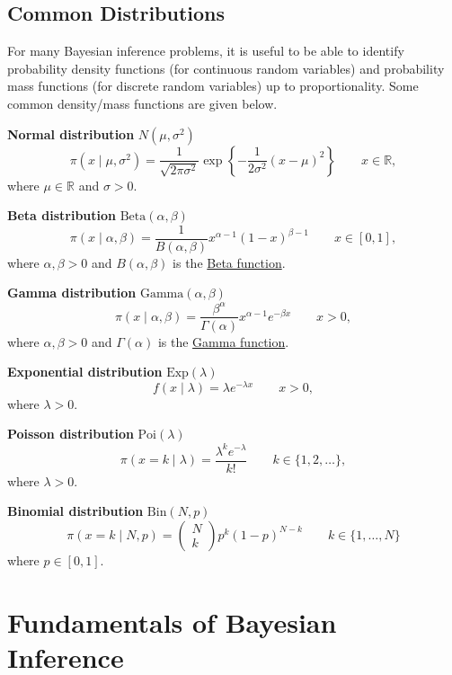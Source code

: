 \documentclass[
]{book}
\begin{document}
\hypertarget{common-distributions}{%
\section{Common Distributions}\label{common-distributions}}

For many Bayesian inference problems, it is useful to be able to
identify probability density functions (for continuous random variables)
and probability mass functions (for discrete random variables) up to
proportionality. Some common density/mass functions are given below.

\textbf{Normal distribution} \(N(\mu,\sigma^2)\)
\[
\pi(x \mid \mu, \sigma^2) = \frac{1}{\sqrt{2\pi\sigma^2}}\exp\left\{-\frac{1}{2\sigma^2}(x-\mu)^2\right\} \qquad x \in\mathbb{R},
\] where \(\mu \in \mathbb{R}\) and \(\sigma > 0\).

\textbf{Beta distribution} \(\text{Beta}(\alpha,\beta)\)
\[
\pi(x\mid \alpha, \beta) = \frac{1}{B(\alpha, \beta)}x^{\alpha-1}(1-x)^{\beta - 1} \qquad  x \in [0, 1],
\] where \(\alpha, \beta > 0\) and \(B(\alpha, \beta)\) is the \href{https://en.wikipedia.org/wiki/Beta_function}{Beta
function}.

\textbf{Gamma distribution} \(\text{Gamma}(\alpha,\beta)\)
\[
\pi(x\mid \alpha, \beta) = \frac{\beta^\alpha}{\Gamma(\alpha)}x^{\alpha - 1}e^{-\beta x} \qquad  x > 0,
\] where \(\alpha, \beta > 0\) and \(\Gamma(\alpha)\) is the \href{https://en.wikipedia.org/wiki/Gamma_function}{Gamma
function}.

\textbf{Exponential distribution} \(\text{Exp}(\lambda)\)
\[
f(x \mid \lambda) = \lambda e^{-\lambda x} \qquad x > 0,
\] where \(\lambda > 0\).

\textbf{Poisson distribution} \(\text{Poi}(\lambda)\)
\[
\pi(x = k \mid \lambda) = \frac{\lambda^k e^{-\lambda}}{k!} \qquad k \in \{1, 2, \ldots\},
\] where \(\lambda > 0\).

\textbf{Binomial distribution} \(\text{Bin}(N,p)\)
\[
\pi(x = k \mid N, p) = \begin{pmatrix} N \\ k\end{pmatrix} p^k (1-p)^{N-k} \qquad k \in \{1, \ldots, N\}
\]
where \(p \in [0, 1]\).

\hypertarget{fundamentals}{%
\chapter{Fundamentals of Bayesian Inference}\label{fundamentals}}
\end{document}
